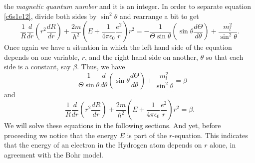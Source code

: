 the \emph{magnetic quantum number} and it is an integer. In order to separate 
equation \eqref{c6s1e12}, divide both sides by $\sin^2\theta$ and rearrange a 
bit to get
\begin{equation}\label{c6s1e15}
\frac{1}{R}\frac{d}{dr}\left(r^2\frac{dR}{dr}\right) +
\frac{2m}{\hslash^2}\left(E + \frac{1}{4\pi\epsilon_0}\frac{e^2}{r}\right)r^2 =
-\frac{1}{\Theta\sin\theta}\left(\sin\theta\frac{d\Theta}{d\theta}\right) +
\frac{m_l^2}{\sin^2\theta}.
\end{equation}
Once again we have a situation in which the left hand side of the equation 
depends on one variable, $r$, and the right hand side on another, $\theta$
so that each side is a constant, say $\beta$. Thus, we have
\begin{equation}\label{c6s1e16}
-\frac{1}{\Theta\sin\theta}\frac{d}{d\theta}
\left(\sin\theta\frac{d\Theta}{d\theta}\right) +\frac{m_l^2}{\sin^2\theta} = 
\beta
\end{equation}
and
\begin{equation}\label{c6s1e17}
\frac{1}{R}\frac{d}{dr}\left(r^2\frac{dR}{dr}\right) +
\frac{2m}{\hslash^2}\left(E + \frac{1}{4\pi\epsilon_0}\frac{e^2}{r}\right)r^2 =
\beta.
\end{equation}
We will solve these equations in the following sections. And yet, before 
proceeding we notice that the energy $E$ is part of the $r$-equation. This 
indicates that the energy of an electron in the Hydrogen atom depends on $r$
alone, in agreement with the Bohr model.

